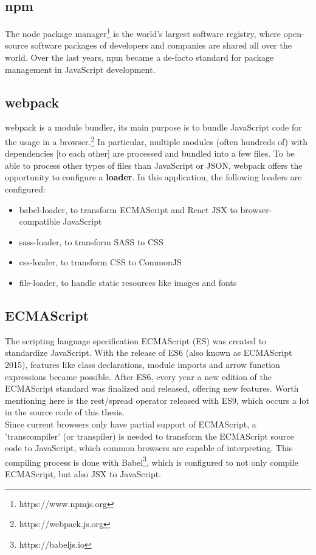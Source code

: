 \documentclass[a4paper,12pt,pdftex,halfparskip,cleardoubleempty,bibtotoc,liststotoc]{scrbook}
\begin{document}
\subsection{npm}

The node package manager\footnote{https://www.npmjs.org} is the world's largest software registry, where open-source software packages of developers and companies are shared all over the world. Over the last years, npm became a de-facto standard for package management in JavaScript development.

\subsection{webpack}

webpack is a module bundler, its main purpose is to bundle JavaScript code for the usage in a browser.\footnote{https://webpack.js.org} In particular, multiple modules (often hundreds of) with dependencies [to each other] are processed and bundled into a few files. To be able to process other types of files than JavaScript or JSON, webpack offers the opportunity to configure a \textbf{loader}. In this application, the following loaders are configured:
\begin{itemize}
\item babel-loader, to transform ECMAScript and React JSX to browser-compatible JavaScript
\item sass-loader, to transform SASS to CSS
\item css-loader, to transform CSS to CommonJS
\item file-loader, to handle static resources like images and fonts
\end{itemize}

\subsection{ECMAScript}

The scripting language specification ECMAScript (ES) was created to standardize JavaScript. With the release of ES6 (also known as ECMAScript 2015), features like class declarations, module imports and arrow function expressions became possible. After ES6, every year a new edition of the ECMAScript standard was finalized and released, offering new features. Worth mentioning here is the rest/spread operator released with ES9, which occurs a lot in the source code of this thesis.\\
Since current browsers only have partial support of ECMAScript, a 'transcompiler' (or transpiler) is needed to transform the ECMAScript source code to JavaScript, which common browsers are capable of interpreting.
This compiling process is done with Babel\footnote{https://babeljs.io}, which is configured to not only compile ECMAScript, but also JSX to JavaScript.
\end{document}
